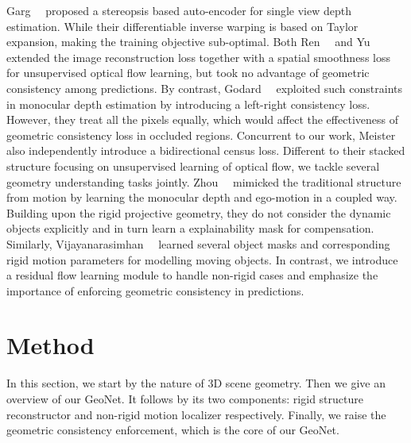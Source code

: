 \documentclass[10pt,twocolumn,letterpaper]{article}
\begin{document}
Garg~\etal~\cite{GargBR16} proposed a stereopsis based auto-encoder for single view depth estimation. While their differentiable inverse warping is based on Taylor expansion, making the training objective sub-optimal.
Both Ren~\etal~\cite{Ren2017UnsupervisedDL} and Yu~\etal~\cite{YuHD16} extended the image reconstruction loss together with a spatial smoothness loss for unsupervised optical flow learning, but took no advantage of geometric consistency among predictions. 
By contrast, Godard~\etal~\cite{monodepth17} exploited such constraints in monocular depth estimation by introducing a left-right consistency loss. 
However, they treat all the pixels equally, which would affect the effectiveness of geometric consistency loss in occluded regions. %
Concurrent to our work, Meister~\etal~\cite{Meister:2018:UUL} also independently introduce a bidirectional census loss. Different to their stacked structure focusing on unsupervised learning of optical flow, we tackle several geometry understanding tasks jointly. 
Zhou~\etal~\cite{zhou2017unsupervised} mimicked the traditional structure from motion by learning the monocular depth and ego-motion in a coupled way. Building upon the rigid projective geometry, they do not consider the dynamic objects explicitly and in turn learn a explainability mask for compensation. Similarly, Vijayanarasimhan~\etal~\cite{Vijayanarasimhan17} learned several object masks and corresponding rigid motion parameters for modelling moving objects. In contrast, we introduce a residual flow learning module to handle non-rigid cases and emphasize the importance of enforcing geometric consistency in predictions. 

\vspace{-1ex}

\section{Method}
\label{sec:method}

In this section, we start by the nature of 3D scene geometry. Then we give an overview of our GeoNet. It follows by its two components: rigid structure reconstructor and non-rigid motion localizer respectively. Finally, we raise the geometric consistency enforcement, which is the core of our GeoNet.
\end{document}
